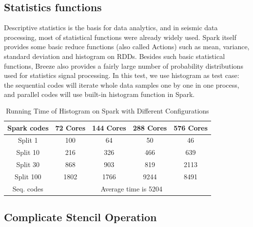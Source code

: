 \subsection{Statistics functions}
Descriptive statistics is the basis for data analytics, and in seismic data processing, most of statistical functions were already widely used. Spark itself provides some basic reduce functions (also called Actions) such as mean, variance, standard deviation and histogram on RDDs. Besides such basic statistical functions, Breeze also provides a fairly large number of probability distributions used for statistics signal processing. In this test, we use histogram as test case: the sequential codes will iterate whole data samples one by one in one process, and parallel codes will use built-in histogram function in Spark.


\begin{table}[h]
\caption{Running Time of Histogram on Spark with Different Configurations}
\centering
\begin{tabular}{||c| c c c c ||} 
 \hline
 Spark codes & 72 Cores & 144 Cores & 288 Cores & 576 Cores \\ 
 \hline
  Split 1   & 100  & 64   & 50   & 46   \\
  Split 10  & 216  & 326  & 466  & 639  \\
  Split 30  & 868  & 903  & 819  & 2113 \\
  Split 100 & 1802 & 1766 & 9244 & 8491 \\
 \hline
 \hline
 Seq. codes & \multicolumn{4}{c||}{Average time is 5204} \\ 
 \hline
\end{tabular}
\label{table:HistSpark}
\end{table}

\subsection{Complicate Stencil Operation}

